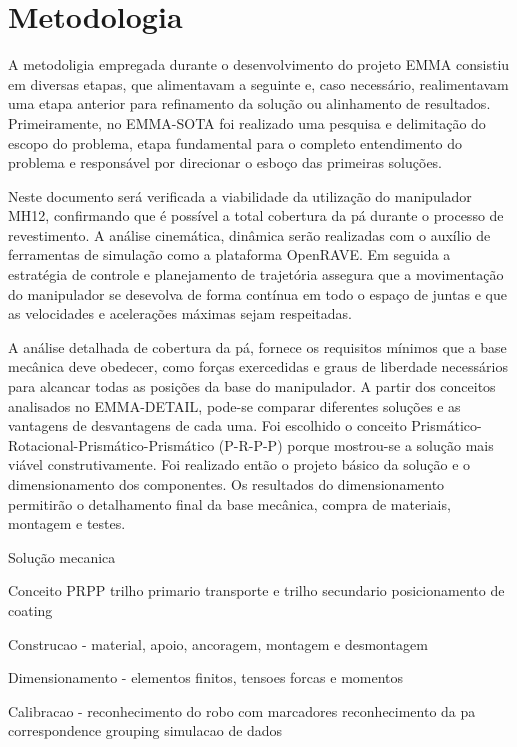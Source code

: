 \section{Metodologia}


A metodoligia empregada durante o desenvolvimento do projeto EMMA consistiu em
diversas etapas, que alimentavam a seguinte e, caso necessário,
realimentavam uma etapa anterior para refinamento da solução ou alinhamento de
resultados. Primeiramente, no EMMA-SOTA foi realizado uma pesquisa e delimitação
do escopo do problema, etapa fundamental para o completo entendimento do problema e
responsável por direcionar o esboço das primeiras soluções. 

Neste documento será verificada a viabilidade da utilização do manipulador MH12,
confirmando que é possível a total cobertura da pá durante o processo de
revestimento. A análise cinemática, dinâmica serão realizadas com o auxílio de
ferramentas de simulação como a plataforma OpenRAVE. Em seguida a estratégia de
controle e planejamento de trajetória assegura que a movimentação do manipulador
se desevolva de forma contínua em todo o espaço de juntas e que as velocidades e
acelerações máximas sejam respeitadas.

A análise detalhada de cobertura da pá, fornece os requisitos mínimos que a base
mecânica deve obedecer, como forças exercedidas e graus de liberdade necessários
para alcancar todas as posições da base do manipulador. A partir dos conceitos
analisados no EMMA-DETAIL, pode-se comparar diferentes soluções e as vantagens
de desvantagens de cada uma. Foi escolhido o conceito
Prismático-Rotacional-Prismático-Prismático (P-R-P-P) porque mostrou-se a
solução mais viável construtivamente. Foi realizado então o projeto básico da
solução e o dimensionamento dos componentes. Os resultados do dimensionamento
permitirão o detalhamento final da base mecânica, compra de materiais, montagem
e testes.





Solução mecanica

Conceito PRPP trilho primario transporte e trilho secundario posicionamento de
coating

Construcao - material, apoio, ancoragem, montagem e desmontagem

Dimensionamento - elementos finitos, tensoes forcas e momentos

Calibracao - reconhecimento do robo com marcadores
reconhecimento da pa correspondence grouping
simulacao de dados 

